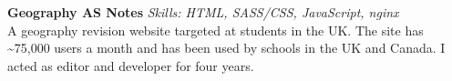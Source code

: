 \textbf{Geography AS Notes}  \newline
\textit{Skills: HTML, SASS/CSS, JavaScript, nginx}\\
A geography revision website targeted at students in the UK. The site has
\textasciitilde{}75,000 users a month and has been used by schools in the UK and
Canada. I acted as editor and developer for four years.

